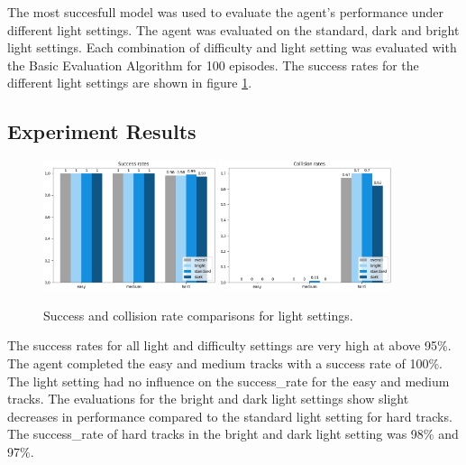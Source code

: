 The most succesfull model was used to evaluate the agent's performance under different light settings. The agent was evaluated on the standard, dark and bright light settings. Each combination of difficulty and light setting was evaluated with the Basic Evaluation Algorithm for 100 episodes. The success rates for the different light settings are shown in figure \ref{fig:result_success_rates_lightSettings}.


\subsection{Experiment Results}

\begin{figure}
    \centering
    \includegraphics[width=0.45\textwidth]{Bilder/notebook_images/hardDistanceMixedLight_eval_all_success_rates_barplot.png}
    \includegraphics[width=0.45\textwidth]{Bilder/notebook_images/hardDistanceMixedLight_eval_all_collision_rates_barplot.png}
    \caption{Success and collision rate comparisons for light settings.}
    \label{fig:result_success_rates_lightSettings}
\end{figure}

The success rates for all light and difficulty settings are very high at above 95\%. The agent completed the easy and medium tracks with a success rate of 100\%. The light setting had no influence on the success\_rate for the easy and medium tracks.
The evaluations for the bright and dark light settings show slight decreases in performance compared to the standard light setting for hard tracks. The success\_rate of hard tracks in the bright and dark light setting was 98\% and 97\%.

